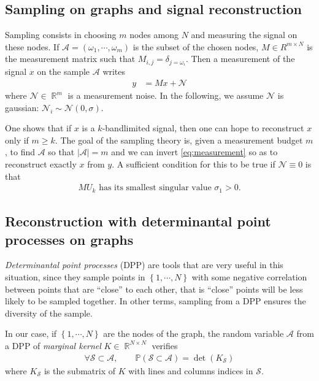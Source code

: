 \documentclass{article}
\newcommand{\abs} [1] {\left| #1 \right|}
\DeclareMathOperator{\R}{\mathbb{R}}
\begin{document}
\subsection{Sampling on graphs and signal reconstruction}


Sampling consists in choosing $m$ nodes among $N$ and measuring the signal on these nodes. If $\mathcal{A} = (\omega_1, \cdots, \omega_m)$ is the subset of the chosen nodes, $M \in R^{m \times N}$ is the measurement matrix such that $M_{i, j} = \delta_{j = \omega_i}$. Then a measurement of the signal $x$ on the sample $\mathcal{A}$ writes
\begin{align} y &= M x + \mathcal{N} \label{eq:measurement}\end{align}
where $\mathcal{N} \in \R^m$ is a measurement noise. In the following, we assume $\mathcal{N}$ is gaussian: $\mathcal{N}_i \sim \mathcal{N}(0, \sigma)$.


One shows that if $x$ is a $k$-bandlimited signal, then one can hope to reconstruct $x$ only if $m \geq k$. The goal of the sampling theory is, given a measurement budget $m$, to find $\mathcal{A}$ so that $\abs{\mathcal{A}} = m$ and we can invert \eqref{eq:measurement} so as to reconstruct exactly $x$ from $y$. A sufficient condition for this to be true if $\mathcal{N} \equiv 0$ is that 
\begin{align} \text{$MU_k$ has its smallest singular value $\sigma_1 > 0$.} \label{eq:sufficientconditionreconstruction}\end{align}


\subsection{Reconstruction with determinantal point processes on graphs}


\emph{Determinantal point processes} (DPP) \cite{kuelsza2012} are tools that are very useful in this situation, since they sample points in $\left\{ 1, \cdots, N\right\}$ with some negative correlation between points that are ``close'' to each other, that is ``close'' points will be less likely to be sampled together. In other terms, sampling from a DPP ensures the diversity of the sample.


In our case, if $\left\{ 1, \cdots, N\right\}$ are the nodes of the graph, the random variable $\mathcal{A}$ from a DPP of \emph{marginal kernel} $K \in \R^{N \times N}$ verifies
\begin{align} \forall \mathcal{S} \subset \mathcal{A}, \qquad \mathbb{P}(\mathcal{S} \subset \mathcal{A}) = \det(K_\mathcal{S}) \label{eq:defDPP}\end{align}
where $K_\mathcal{S}$ is the submatrix of $K$ with lines and columns indices in $\mathcal{S}$.
\end{document}
